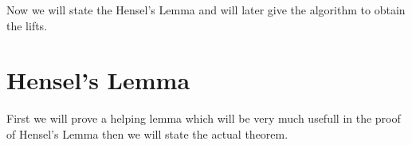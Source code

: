 Now we will state the Hensel's Lemma and will later give the algorithm to obtain the lifts.
\section{Hensel's Lemma}
First we will prove a helping lemma which will be very much usefull in the proof of Hensel's Lemma  then we will state the actual theorem.
